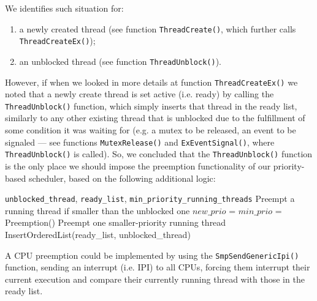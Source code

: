 We identifies such situation for:
\begin{enumerate}
    \item a newly created thread (see function \lstinline|ThreadCreate()|, which further calls \lstinline|ThreadCreateEx()|);
    
    \item an unblocked thread (see function \lstinline|ThreadUnblock()|).
\end{enumerate}

However, if when we looked in more details at function \lstinline|ThreadCreateEx()| we noted that a newly create thread is set active (i.e. ready) by calling the \lstinline|ThreadUnblock()| function, which simply inserts that thread in the ready list, similarly to any other existing thread that is unblocked due to the fulfillment of some condition it was waiting for (e.g. a mutex to be released, an event to be signaled --- see functions \lstinline|MutexRelease()| and \lstinline|ExEventSignal()|, where \lstinline|ThreadUnblock()| is called). So, we concluded that the \lstinline|ThreadUnblock()| function is the only place we should impose the preemption functionality of our priority-based scheduler, based on the following additional logic:


\begin{algorithmic}
\Require \texttt{unblocked\_thread}, \texttt{ready\_list}, \texttt{min\_priority\_running\_threads}
\Ensure Preempt a running thread if smaller than the unblocked one
\State $new\_prio$ = 
\State $min\_prio$ =  
  \State Preemption() \Comment Preempt one smaller-priority running thread
\Else
  \State InsertOrderedList(ready\_list, unblocked\_thread)
\EndIf
\end{algorithmic}

A CPU preemption could be implemented by using the \lstinline|SmpSendGenericIpi()| function, sending an interrupt (i.e. IPI) to all CPUs, forcing them interrupt their current execution and compare their currently running thread with those in the ready list. 

